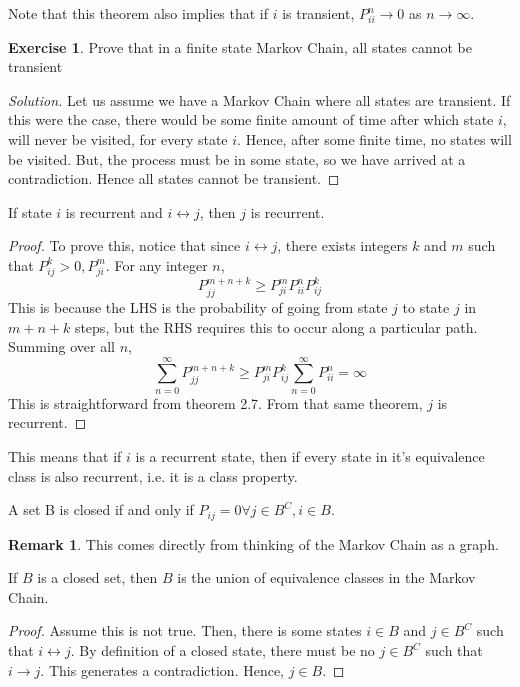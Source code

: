 \documentclass[12pt,letterpaper]{book}
\theoremstyle{definition}
\newtheorem*{remark}{Remark}
\newtheorem*{exercise}{Exercise}
\newenvironment{solution}
  {\renewcommand\qedsymbol{$\blacksquare$}\begin{proof}[Solution]}
  {\end{proof}}
\begin{document}
Note that this theorem also implies that if $i$ is transient, $P_{ii}^n \rightarrow 0$ as $n \rightarrow \infty$.

\begin{exercise}
  Prove that in a finite state Markov Chain, all states cannot be transient 
\end{exercise}
\begin{solution}
Let us assume we have a Markov Chain where all states are transient. If this were the case, there would be some finite amount of time after which state $i$, will never be visited, for every state $i$. Hence, after some finite time, no states will be visited. But, the process must be in some state, so we have arrived at a contradiction. Hence all states cannot be transient.
\end{solution}

\begin{theorem}
  If state $i$ is recurrent and $i \leftrightarrow j$, then $j$ is recurrent.
\end{theorem}
\begin{proof}
  To prove this, notice that since $i \leftrightarrow j$, there exists integers $k$ and $m$ such that $P^k_{ij} > 0, P^{m}_{ji}$. For any integer $n$, 
  \[P_{jj}^{m+n+k} \geq P_{ji}^m P_{ii}^n P_{ij}^k\]
  This is because the LHS is the probability of going from state $j$ to state $j$ in $m+n+k$ steps, but the RHS requires this to occur along a particular path. Summing over all $n$, 
  \[\sum_{n=0}^{\infty} P_{jj}^{m+n+k} \geq P_{ji}^m P_{ij}^k \sum_{n=0}^{\infty} P_{ii}^n = \infty\]
  This is straightforward from theorem 2.7. From that same theorem, $j$ is recurrent.
\end{proof}

This means that if $i$ is a recurrent state, then if every state in it's equivalence class is also recurrent, i.e. it is a class property.

\begin{theorem}
  A set B is closed if and only if $P_{ij} = 0 \forall j \in B^C, i \in B$.  
\end{theorem}
\begin{remark}
  This comes directly from thinking of the Markov Chain as a graph.
\end{remark}

\begin{theorem}
  If $B$ is a closed set, then $B$ is the union of equivalence classes in the Markov Chain.
\end{theorem}
\begin{proof}
  Assume this is not true. Then, there is some states $i \in B$ and $j \in B^C$ such that $i \leftrightarrow j$. By definition of a closed state, there must be no $j \in B^C$ such that $i \rightarrow j$. This generates a contradiction. Hence, $j \in B$.
\end{proof}
\end{document}
